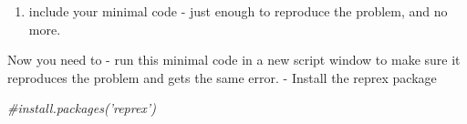 \documentclass[
]{book}
\newenvironment{Shaded}{\begin{snugshade}}{\end{snugshade}}
\newcommand{\CommentTok}[1]{\textcolor[rgb]{0.56,0.35,0.01}{\textit{#1}}}
\newcommand{\DecValTok}[1]{\textcolor[rgb]{0.00,0.00,0.81}{#1}}
\newcommand{\FloatTok}[1]{\textcolor[rgb]{0.00,0.00,0.81}{#1}}
\newcommand{\KeywordTok}[1]{\textcolor[rgb]{0.13,0.29,0.53}{\textbf{#1}}}
\newcommand{\NormalTok}[1]{#1}
\newcommand{\OperatorTok}[1]{\textcolor[rgb]{0.81,0.36,0.00}{\textbf{#1}}}
\newcommand{\StringTok}[1]{\textcolor[rgb]{0.31,0.60,0.02}{#1}}
\providecommand{\tightlist}{%
  \setlength{\itemsep}{0pt}\setlength{\parskip}{0pt}}
\begin{document}
\begin{Shaded}
\end{Shaded}

\begin{enumerate}
\def\labelenumi{\arabic{enumi}.}
\setcounter{enumi}{2}
\tightlist
\item
  include your minimal code - just enough to reproduce the problem, and no more.
\end{enumerate}

Now you need to
- run this minimal code in a new script window to make sure it reproduces the problem and gets the same error.
- Install the reprex package

\begin{Shaded}
\begin{Highlighting}[]
\CommentTok{#install.packages('reprex')}
\end{Highlighting}
\end{Shaded}
\end{document}
